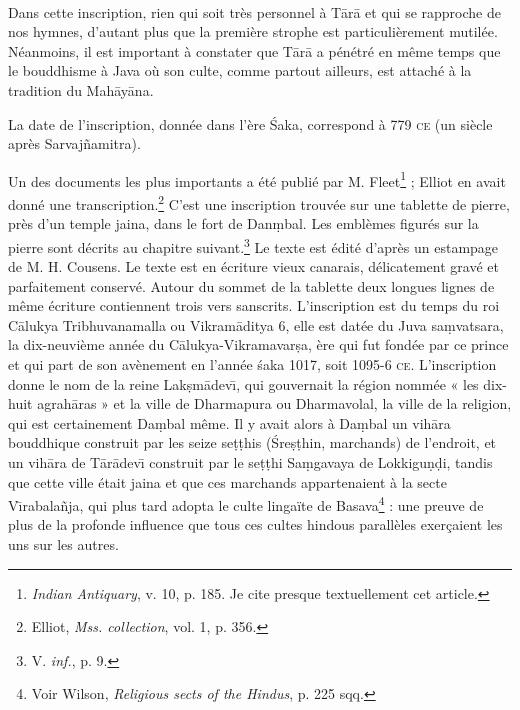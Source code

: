\documentclass[a4paper, 11pt, oneside, french]{article}
\begin{document}
\paragraph{}
Dans cette inscription, rien qui soit très personnel à T\={a}r\={a} et qui se rapproche de nos hymnes, d'autant plus que la première strophe est particulièrement mutilée. Néanmoins, il est important à constater que T\={a}r\={a} a pénétré en même temps que le bouddhisme à Java où son culte, comme partout ailleurs, est attaché à la tradition du Mah\={a}y\={a}na.

La date de l'inscription, donnée dans l'ère \'{S}aka, correspond à 779 \textsc{ce} (un siècle après Sarvaj\~{n}amitra).

Un des documents les plus importants a été publié par M. Fleet\footnote{\emph{Indian Antiquary}, v. 10, p. 185. Je cite presque textuellement cet article.} ; Elliot en avait donné une transcription.\footnote{Elliot, \emph{Mss. collection}, vol. 1, p. 356.} C'est une inscription trouvée sur une tablette de pierre, près d'un temple jaina, dans le fort de Dan\d{m}bal. Les emblèmes figurés sur la pierre sont décrits au chapitre suivant.\footnote{V. \emph{inf.}, p. 9.} Le texte est édité d'après un estampage de M. H. Cousens. Le texte est en écriture vieux canarais, délicatement gravé et parfaitement conservé. Autour du sommet de la tablette deux longues lignes de même écriture contiennent trois vers sanscrits. L'inscription est du temps du roi C\={a}lukya Tribhuvanamalla ou Vikram\={a}ditya 6, elle est datée du Juva sa\d{m}vatsara, la dix-neuvième année du C\={a}lukya-Vikramavar\d{s}a, ère qui fut fondée par ce prince et qui part de son avènement en l'année \'{s}aka 1017, soit 1095-6 \textsc{ce}. L'inscription donne le nom de la reine Lak\d{s}m\={a}dev\={\i}, qui gouvernait la région nommée « les dix-huit agrah\={a}ras » et la ville de Dharmapura ou Dharmavolal, la ville de la religion, qui est certainement Da\d{m}bal même. Il y avait alors à Da\d{m}bal un vih\={a}ra bouddhique construit par les seize se\d{t}\d{t}his (\'{S}re\d{s}\d{t}hin, marchands) de l'endroit, et un vih\={a}ra de T\={a}r\={a}dev\={\i} construit par le se\d{t}\d{t}hi Sa\d{m}gavaya de Lokkigu\d{n}\d{d}i, tandis que cette ville était jaina et que ces marchands appartenaient à la secte V\={\i}rabala\~{n}ja, qui plus tard adopta le culte lingaïte de Basava\footnote{Voir Wilson, \emph{Religious sects of the Hindus}, p. 225 sqq.} : une preuve de plus de la profonde influence que tous ces cultes hindous parallèles exerçaient les uns sur les autres.
\end{document}
